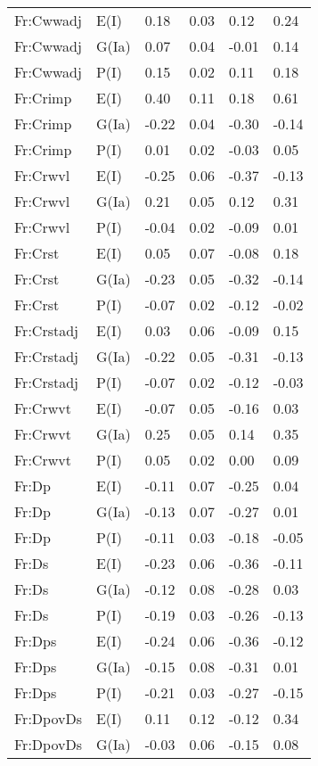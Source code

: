 \begin{center}
\begin{longtable}{|p{1.1in}|p{0.7in}|p{0.7in}|p{0.6in}|p{0.6in}|p{0.6in}|}
  Fr:Cwwadj & E(I) & 0.18 & 0.03 & 0.12 & 0.24 \\ 
  Fr:Cwwadj & G(Ia) & 0.07 & 0.04 & -0.01 & 0.14 \\ 
  Fr:Cwwadj & P(I) & 0.15 & 0.02 & 0.11 & 0.18 \\ 
  Fr:Crimp & E(I) & 0.40 & 0.11 & 0.18 & 0.61 \\ 
  Fr:Crimp & G(Ia) & -0.22 & 0.04 & -0.30 & -0.14 \\ 
  Fr:Crimp & P(I) & 0.01 & 0.02 & -0.03 & 0.05 \\ 
  Fr:Crwvl & E(I) & -0.25 & 0.06 & -0.37 & -0.13 \\ 
  Fr:Crwvl & G(Ia) & 0.21 & 0.05 & 0.12 & 0.31 \\ 
  Fr:Crwvl & P(I) & -0.04 & 0.02 & -0.09 & 0.01 \\ 
  Fr:Crst & E(I) & 0.05 & 0.07 & -0.08 & 0.18 \\ 
  Fr:Crst & G(Ia) & -0.23 & 0.05 & -0.32 & -0.14 \\ 
  Fr:Crst & P(I) & -0.07 & 0.02 & -0.12 & -0.02 \\ 
  Fr:Crstadj & E(I) & 0.03 & 0.06 & -0.09 & 0.15 \\ 
  Fr:Crstadj & G(Ia) & -0.22 & 0.05 & -0.31 & -0.13 \\ 
  Fr:Crstadj & P(I) & -0.07 & 0.02 & -0.12 & -0.03 \\ 
  Fr:Crwvt & E(I) & -0.07 & 0.05 & -0.16 & 0.03 \\ 
  Fr:Crwvt & G(Ia) & 0.25 & 0.05 & 0.14 & 0.35 \\ 
  Fr:Crwvt & P(I) & 0.05 & 0.02 & 0.00 & 0.09 \\ 
  Fr:Dp & E(I) & -0.11 & 0.07 & -0.25 & 0.04 \\ 
  Fr:Dp & G(Ia) & -0.13 & 0.07 & -0.27 & 0.01 \\ 
  Fr:Dp & P(I) & -0.11 & 0.03 & -0.18 & -0.05 \\ 
  Fr:Ds & E(I) & -0.23 & 0.06 & -0.36 & -0.11 \\ 
  Fr:Ds & G(Ia) & -0.12 & 0.08 & -0.28 & 0.03 \\ 
  Fr:Ds & P(I) & -0.19 & 0.03 & -0.26 & -0.13 \\ 
  Fr:Dps & E(I) & -0.24 & 0.06 & -0.36 & -0.12 \\ 
  Fr:Dps & G(Ia) & -0.15 & 0.08 & -0.31 & 0.01 \\ 
  Fr:Dps & P(I) & -0.21 & 0.03 & -0.27 & -0.15 \\ 
  Fr:DpovDs & E(I) & 0.11 & 0.12 & -0.12 & 0.34 \\ 
  Fr:DpovDs & G(Ia) & -0.03 & 0.06 & -0.15 & 0.08 \\ 

\end{longtable}
\end{center}
